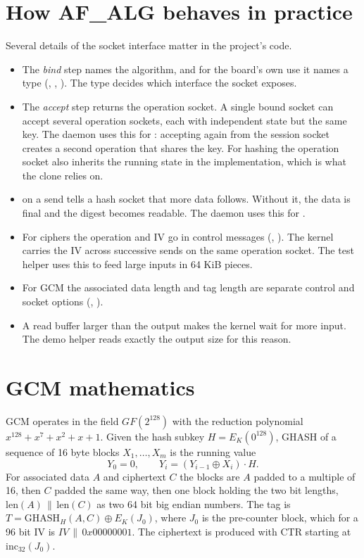 \section{How AF\_ALG behaves in practice}

Several details of the socket interface matter in the project's code.

\begin{itemize}
  \item The \emph{bind} step names the algorithm, and for the board's own use it names a type (, , ). The type decides which interface the socket exposes.
  \item The \emph{accept} step returns the operation socket. A single bound socket can accept several operation sockets, each with independent state but the same key. The daemon uses this for : accepting again from the session socket creates a second operation that shares the key. For hashing the operation socket also inherits the running state in the implementation, which is what the clone relies on.
  \item {} on a send tells a hash socket that more data follows. Without it, the data is final and the digest becomes readable. The daemon uses this for .
  \item For ciphers the operation and IV go in control messages (, ). The kernel carries the IV across successive sends on the same operation socket. The test helper uses this to feed large inputs in 64 KiB pieces.
  \item For GCM the associated data length and tag length are separate control and socket options (, ).
  \item A read buffer larger than the output makes the kernel wait for more input. The demo helper reads exactly the output size for this reason.
\end{itemize}

\section{GCM mathematics}\label{sec:gcmmath}

GCM operates in the field $GF(2^{128})$ with the reduction polynomial $x^{128}+x^7+x^2+x+1$. Given the hash subkey $H = E_K(0^{128})$, GHASH of a sequence of 16 byte blocks $X_1,\ldots,X_m$ is the running value
\[
Y_0 = 0,\qquad Y_i = (Y_{i-1} \oplus X_i)\cdot H .
\]
For associated data $A$ and ciphertext $C$ the blocks are $A$ padded to a multiple of 16, then $C$ padded the same way, then one block holding the two bit lengths, $\mathrm{len}(A)\,\|\,\mathrm{len}(C)$ as two 64 bit big endian numbers. The tag is $T = \text{GHASH}_H(A,C) \oplus E_K(J_0)$, where $J_0$ is the pre-counter block, which for a 96 bit IV is $IV\,\|\,0x00000001$. The ciphertext is produced with CTR starting at $\text{inc}_{32}(J_0)$.

